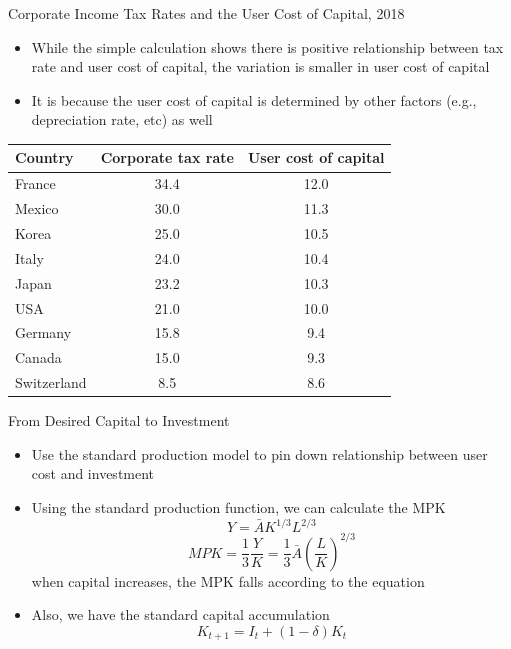 \documentclass[aspectratio=1610]{beamer}
\begin{document}
\begin{frame}[wide]{Corporate Income Tax Rates and the User Cost of Capital, 2018}
	\begin{itemize}
		\item While the simple calculation shows there is positive relationship between tax rate and user cost of capital, the variation is smaller in user cost of capital
		\item It is because the user cost of capital is determined by other factors (e.g., depreciation rate, etc) as well
	\end{itemize}
	\begin{table}[htbp]
		\centering
		\begin{tabular}{lcc} \hline \hline
			Country & Corporate tax rate & User cost of capital \\
			\midrule
			France & 34.4  & 12.0 \\
			Mexico & 30.0    & 11.3 \\
			Korea & 25.0    & 10.5 \\
			Italy & 24.0    & 10.4 \\
			Japan & 23.2  & 10.3 \\
			USA   & 21.0    & 10.0 \\
			Germany & 15.8  & 9.4 \\
			Canada & 15.0    & 9.3 \\
			Switzerland & 8.5 & 8.6 \\
			\bottomrule
		\end{tabular}%
	\end{table}%
	
\end{frame}

\begin{frame}[wide]{From Desired Capital to Investment}
	\begin{itemize}
		\item Use the standard production model to pin down relationship between user cost and investment
		\item Using the standard production function, we can calculate the MPK
		\[Y=\bar{A}K^{1/3}L^{2/3}\]
		\[MPK = \frac{1}{3} \frac{Y}{K} = \frac{1}{3} \bar{A} \left(\frac{L}{K}\right)^{2/3}\]
		when capital increases, the MPK falls according to the equation
		\item Also, we have the standard capital accumulation
		\[K_{t+1} = I_t + (1-\delta) K_t\]
	\end{itemize}
\end{frame}
\end{document}
